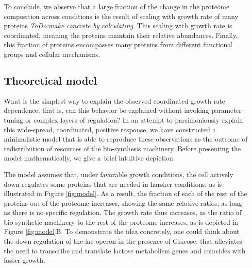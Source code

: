 \documentclass[notitlepage]{article}
\begin{document}
To conclude, we observe that a large fraction of the change in the proteome composition across conditions is the result of scaling with growth rate of many proteins \emph{ToDo:make concrete by calculating}.
This scaling with growth rate is coordinated, meaning the proteins maintain their relative abundances.
Finally, this fraction of proteins encompasses many proteins from different functional groups and cellular mechanisms.

\subsection{Theoretical model}
What is the simplest way to explain the observed coordinated growth rate dependence, that is, can this behavior be explained without invoking parameter tuning or complex layers of regulation?
In an attempt to parsimoniously explain this wide-spread, coordinated, positive response, we have constructed a minimalistic model that is able to reproduce these observations as the outcome of redistribution of resources of the bio-synthesis machinery.
Before presenting the model mathematically, we give a brief intuitive depiction.

The model assumes that, under favorable growth conditions, the cell actively down-regulates some proteins that are needed in harsher conditions, as is illustrated in Figure \ref{fig:model}.
As a result, the fraction of each of the rest of the proteins out of the proteome increases, showing the same relative ratios, as long as there is no specific regulation.
The growth rate thus increases, as the ratio of bio-synthetic machinery to the rest of the proteome increases, as is depicted in Figure \ref{fig:model}B.
To demonstrate the idea concretely, one could think about the down regulation of the lac operon in the presence of Glucose, that alleviates the need to transcribe and translate lactose metabolism genes and coincides with faster growth.
\end{document}
